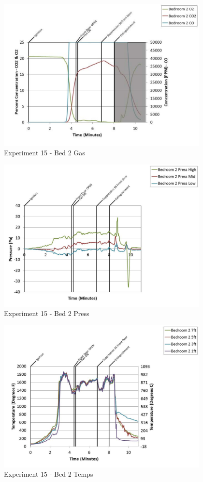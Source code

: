 \documentclass{article}
\begin{document}
\begin{appendices}
	\begin{figure}[h!]
		\centering
		\includegraphics[height=3.05in]{0_Images/Results_Charts/Exp_15_Charts/Bed2Gas.pdf}
		\caption{Experiment 15 - Bed 2 Gas}
	\end{figure}
 
	\clearpage

	\begin{figure}[h!]
		\centering
		\includegraphics[height=3.05in]{0_Images/Results_Charts/Exp_15_Charts/Bed2Press.pdf}
		\caption{Experiment 15 - Bed 2 Press}
	\end{figure}
 

	\begin{figure}[h!]
		\centering
		\includegraphics[height=3.05in]{0_Images/Results_Charts/Exp_15_Charts/Bed2Temps.pdf}
		\caption{Experiment 15 - Bed 2 Temps}
	\end{figure}
 

\end{appendices}
\end{document}
